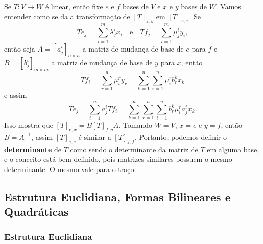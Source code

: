 Se $T \colon V \to W$ é linear, então fixe $e$ e $f$ bases de $V$ e $x$ e $y$ bases de $W$. Vamos entender como se da a transformação de $[T]_{f,y}$ em $[T]_{e,x}$. Se \begin{equation}
    Te_j = \sum_{i = 1}^m \lambda^i_j x_i \quad \text{e} \quad Tf_j = \sum_{i = 1}^m \mu^i_j y_i,
\end{equation} então seja $A = [a^i_j]_{n \times n}$ a matriz de mudança de base de $e$ para $f$ e $B = [b^i_j]_{m \times m}$ a matriz de mudança de base de $y$ para $x$, então \begin{equation}
    Tf_i = \sum_{r = 1}^n \mu^r_i y_r = \sum_{k = 1}^n \sum_{r = 1}^n \mu^r_i b^k_r x_k
\end{equation} e assim \begin{equation}
    Te_j = \sum_{i = 1}^n a^i_j Tf_i = \sum_{k = 1}^n \sum_{r = 1}^n \sum_{i = 1}^n b^k_r \mu^r_i a^i_j x_k.
\end{equation} Isso mostra que $[T]_{e,x} = B[T]_{f,y}A$. Tomando $W = V$, $x = e$ e $y = f$, então $B = A^{-1}$, assim $[T]_{e,e}$ é similar a $[T]_{f,f}$. Portanto, podemos definir o \textbf{determinante} de $T$ como sendo o determinante da matriz de $T$ em alguma base, e o conceito está bem definido, pois matrizes similares possuem o mesmo determinante. O mesmo vale para o traço.

\subsection{Estrutura Euclidiana, Formas Bilineares e Quadráticas}

\subsubsection*{Estrutura Euclidiana}

